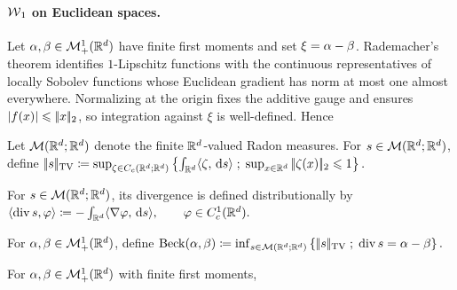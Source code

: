 \paragraph{\texorpdfstring{$\operatorname{\mathcal{W}}_1$ on Euclidean spaces.}{W1 on Euclidean spaces.}}
Let $\alpha,\beta\in\mathcal{M}_+^1(\mathbb{R}^d)$ have finite first moments and set $\xi=\alpha-\beta$. Rademacher's theorem identifies $1$-Lipschitz functions with the continuous representatives of locally Sobolev functions whose Euclidean gradient has norm at most one almost everywhere. Normalizing at the origin fixes the additive gauge and ensures $|f(x)|\leqslant|\!| x |\!|_2$, so integration against $\xi$ is well-defined. Hence
\begin{defn}\label{def-vector-measure-tv}
Let $\mathcal{M}(\mathbb{R}^d;\mathbb{R}^d)$ denote the finite $\mathbb{R}^d$-valued Radon measures. For $s\in\mathcal{M}(\mathbb{R}^d;\mathbb{R}^d)$, define
\(|\!| s |\!|_{\operatorname{TV}} \coloneqq \sup_{\zeta\in C_c(\mathbb{R}^d;\mathbb{R}^d)} \left\{ \int_{\mathbb{R}^d}\langle \zeta,\,\mathrm{d}s\rangle \;;\; \sup_{x\in\mathbb{R}^d}|\!| \zeta(x) |\!|_2\leqslant1 \right\}.\)
\end{defn}
For $s\in\mathcal{M}(\mathbb{R}^d;\mathbb{R}^d)$, its divergence is defined distributionally by \(\langle\operatorname{div}s,\varphi\rangle \coloneqq -\int_{\mathbb{R}^d}\langle \nabla\varphi,\,\mathrm{d}s\rangle, \qquad \varphi\in C_c^1(\mathbb{R}^d).\)
\begin{defn}\label{def-beckmann-problem}
For $\alpha,\beta\in\mathcal{M}_+^1(\mathbb{R}^d)$, define
\(\operatorname{Beck}(\alpha,\beta) \coloneqq \inf_{s\in\mathcal{M}(\mathbb{R}^d;\mathbb{R}^d)} \left\{ |\!| s |\!|_{\operatorname{TV}} \;;\; \operatorname{div}s=\alpha-\beta \right\}.\)
\end{defn}
\begin{prop}\label{prop-euclidean-beckmann}
For $\alpha,\beta\in\mathcal{M}_+^1(\mathbb{R}^d)$ with finite first moments,
\end{prop}
